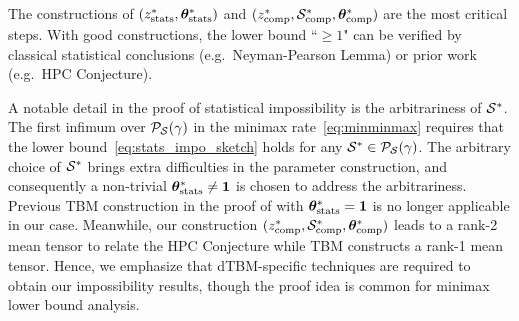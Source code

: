 \documentclass[journal]{IEEEtran}
\theoremstyle{definition}
\theoremstyle{definition}
\begin{document}
The constructions of $(z^*_{\rm stats}, \boldsymbol{\theta}^*_{\rm stats})$ and $(z^*_{\rm comp}, \mathcal{S}^*_{\rm comp}, \boldsymbol{\theta}^*_{\rm comp})$ are the most critical steps. With good constructions, the lower bound ``$\geq 1$" can be verified by classical statistical conclusions (e.g.\ Neyman-Pearson Lemma) or prior work (e.g.\ HPC Conjecture). 

A notable detail in the proof of statistical impossibility is the arbitrariness of $\mathcal{S}^*$. The first infimum over $ \mathcal{P}_{\mathcal{S}}(\gamma)$ in the minimax rate~\eqref{eq:minminmax} requires that the lower bound~\eqref{eq:stats_impo_sketch} holds for any $\mathcal{S}^* \in \mathcal{P}_{\mathcal{S}}(\gamma)$. The arbitrary choice of $\mathcal{S}^*$ brings extra difficulties in the parameter construction, and consequently a non-trivial $\boldsymbol{\theta}^*_{\rm stats} \neq \mathbf{1}$ is chosen to address the arbitrariness. Previous TBM construction in the proof of \cite[Theorem 6]{han2020exact} with $\boldsymbol{\theta}^*_{\rm stats} = \mathbf{1}$ is no longer applicable in our case. Meanwhile, our construction $(z^*_{\rm comp}, \mathcal{S}^*_{\rm comp}, \boldsymbol{\theta}^*_{\rm comp})$ leads to a rank-2 mean tensor to relate the HPC Conjecture while TBM \cite[Theorem 7]{han2020exact} constructs a rank-1 mean tensor. Hence, we emphasize that dTBM-specific techniques are required to obtain our impossibility results, though the proof idea is common for minimax lower bound analysis. 
\end{document}
